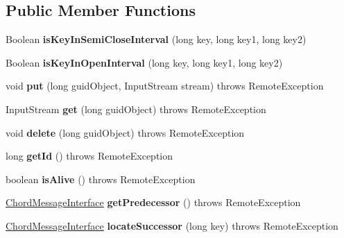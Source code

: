 \subsection*{Public Member Functions}
\begin{DoxyCompactItemize}
\item 
\mbox{\label{class_chord_aa0b073bf26ea53ee4c36749b5bde4935}} 
Boolean {\bfseries is\+Key\+In\+Semi\+Close\+Interval} (long key, long key1, long key2)
\item 
\mbox{\label{class_chord_a68c9c3d06da58a6a32aa536751d6a221}} 
Boolean {\bfseries is\+Key\+In\+Open\+Interval} (long key, long key1, long key2)
\item 
\mbox{\label{class_chord_a24d1b07e8c80574244876cf84f86aa4d}} 
void {\bfseries put} (long guid\+Object, Input\+Stream stream)  throws Remote\+Exception 
\item 
\mbox{\label{class_chord_a3e0b4e9a1af09a0604be7eecea716cba}} 
Input\+Stream {\bfseries get} (long guid\+Object)  throws Remote\+Exception 
\item 
\mbox{\label{class_chord_a8bc6bdc9f92665955ae6907f15cc7ea6}} 
void {\bfseries delete} (long guid\+Object)  throws Remote\+Exception 
\item 
\mbox{\label{class_chord_a3dfb600d109b7d23459a3353af0274a9}} 
long {\bfseries get\+Id} ()  throws Remote\+Exception 
\item 
\mbox{\label{class_chord_a0a677ced19cc0cb5afd2a695977aeb95}} 
boolean {\bfseries is\+Alive} ()  throws Remote\+Exception 
\item 
\mbox{\label{class_chord_a3f1aadce3820e808c80662bb61a58e34}} 
\mbox{\hyperlink{interface_chord_message_interface}{Chord\+Message\+Interface}} {\bfseries get\+Predecessor} ()  throws Remote\+Exception 
\item 
\mbox{\label{class_chord_a7e354ea388d048d4910fa28b182ebe9f}} 
\mbox{\hyperlink{interface_chord_message_interface}{Chord\+Message\+Interface}} {\bfseries locate\+Successor} (long key)  throws Remote\+Exception 
\item 

\end{DoxyCompactItemize}

